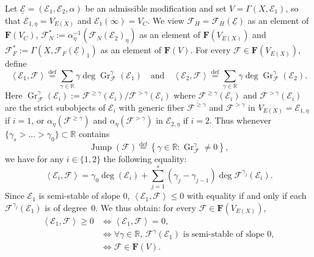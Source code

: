 \documentclass[11pt]{article}
\theoremstyle{definition}
\numberwithin{equation}{section}
\numberwithin{figure}{section}
\numberwithin{table}{section}
\DeclareMathOperator{\Gr}{Gr}
\DeclareMathOperator{\Jump}{Jump}
\newcommand{\eqd}{\stackrel{\mathrm{def}}{=}}
\let\oldforall\forall
\renewcommand*{\forall}{\mathrel{\oldforall}}
\begin{document}
Let $\underline{\mathcal{E}}=(\mathcal{E}_{1},\mathcal{E}_{2},\alpha)$ be an admissible modification and set $V=\Gamma(X,\mathcal{E}_{1})$, so that $\mathcal{E}_{1,\eta}=V_{E(X)}$ and $\mathcal{E}_{1}(\infty)=V_{C}$. We view $\mathcal{F}_{H}=\mathcal{F}_{H}(\underline{\mathcal{E}})$ as an element of $\mathbf{F}(V_{C})$, $\mathcal{F}_{N}^{\ast}:=\alpha_{\eta}^{-1}(\mathcal{F}_{N}(\mathcal{E}_{2})_{\eta})$ as an element of $\mathbf{F}(V_{E(X)})$ and $\mathcal{F}_{F}^{\ast}:=\Gamma(X,\mathcal{F}_{F}(\underline{\mathcal{E}})_{1})$ as an element of $\mathbf{F}(V)$. For every $\mathcal{F}\in\mathbf{F}(V_{E(X)})$, define
\[
\left\langle \mathcal{E}_{1},\mathcal{F}\right\rangle \eqd\sum_{\gamma\in\mathbb{R}}\gamma\deg\Gr_{\mathcal{F}}^{\gamma}\left(\mathcal{E}_{1}\right)\quad\text{and}\quad\left\langle \mathcal{E}_{2},\mathcal{F}\right\rangle \eqd\sum_{\gamma\in\mathbb{R}}\gamma\deg\Gr_{\mathcal{F}}^{\gamma}\left(\mathcal{E}_{2}\right).
\]
Here $\Gr_{\mathcal{F}}^{\gamma}(\mathcal{E}_{i}):=\mathcal{F}^{\geq\gamma}(\mathcal{E}_{i})/\mathcal{F}^{>\gamma}(\mathcal{E}_{i})$ where $\mathcal{F}^{\geq\gamma}(\mathcal{E}_{i})$ and $\mathcal{F}^{>\gamma}(\mathcal{E}_{i})$ are the strict subobjects of $\mathcal{E}_{i}$ with generic fiber $\mathcal{F}^{\geq\gamma}$ and $\mathcal{F}^{>\gamma}$ in $V_{E(X)}=\mathcal{E}_{1,\eta}$ if $i=1$, or $\alpha_{\eta}(\mathcal{F}^{\geq\gamma})$ and $\alpha_{\eta}(\mathcal{F}^{>\gamma})$ in $\mathcal{E}_{2,\eta}$ if $i=2$. Thus whenever $\{\gamma_{s}>\dots>\gamma_{0}\}\subset\mathbb{R}$ contains
\[
\Jump(\mathcal{F})\eqd\left\{ \gamma\in\mathbb{R}:\Gr_{\mathcal{F}}^{\gamma}\neq0\right\},
\]
we have for any $i\in\{1,2\}$ the following equality:
\[
\left\langle \mathcal{E}_{i},\mathcal{F}\right\rangle =\gamma_{0}\deg(\mathcal{E}_{i})+\sum_{j=1}^{s}\left(\gamma_{j}-\gamma_{j-1}\right)\deg\mathcal{F}^{\gamma_{j}}\left(\mathcal{E}_{i}\right).
\]
Since $\mathcal{E}_{1}$ is semi-stable of slope $0$, $\left\langle
\mathcal{E}_{1},\mathcal{F}\right\rangle \leq0$ with equality if and only if each $\mathcal{F}^{\gamma_{j}}(\mathcal{E}_{1})$ is of degree~$0$. We thus obtain: for every $\mathcal{F}\in\mathbf{F}(V_{E(X)})$,
\begin{align*}
\left\langle \mathcal{E}_{1},\mathcal{F}\right\rangle \geq0 & \iff \left\langle \mathcal{E}_{1},\mathcal{F}\right\rangle =0,\\
& \iff {\forall\gamma\in\mathbb{R}},\,\mathcal{F}^{\gamma}(\mathcal{E}_{1})\text{ is semi-stable of slope }0,\\
& \iff \mathcal{F}\in\mathbf{F}(V).
\end{align*}
\end{document}
